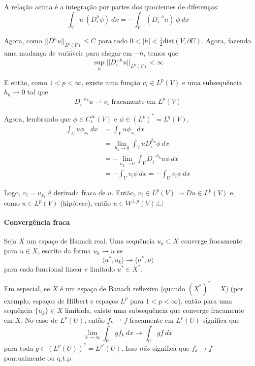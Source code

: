 \documentclass[a4paper, 11pt]{book}
\newcommand{\qed}{$\hfill\square$}
\begin{document}
\begin{enumerate}[(i)]
	A relação acima é a integração por partes dos quocientes de diferenças: \begin{equation}\label{intpartes-quocientes}
		\int_V u\ ( D_i^h \phi )\ dx = - \int_V (D_i^{-h}u)\ \phi \ dx 
	\end{equation}

	Agora, como $||D^h u||_{L^p(V)}\leq C$ para todo $0<|h|<\frac{1}{2}\text{dist}(V, \partial U)$. Agora, fazendo uma mudança de variáveis para chegar em $-h$, temos que
	\[ \sup_h ||D_i^{-h} u ||_{L^p(V)} < \infty \]

	E então, como $1<p<\infty$, existe uma função $v_i \in L^p(V)$ e uma subsequência $h_k \rightarrow 0$ tal que \[ D_i^{-h_k}u  \rightharpoonup v_i \text{ fracamente em } L^p(V)\]

	Agora, lembrando que $\phi \in C^\infty_c(V)$ e $\phi \in (L^p)^* = L^q(V)$, \begin{align*}
		\int_U u \phi_{x_i}\ dx &= \int_V u \phi_{x_i}\ dx \\ &= \lim_{h_k \rightarrow 0} \int_V u D_i^{h_k}\phi \ dx\\
		&= - \lim_{h_k\rightarrow 0} \int_V D_i^{-h_k}u \phi \ dx \\
		&= - \int_V v_i \phi \ dx = - \int_U v_i \phi \ dx
	\end{align*}

	Logo, $v_i = u_{x_i}$ é derivada fraca de $u$. Então, $v_i \in L^p(V) \Rightarrow Du \in L^p(V)$ e, como $u \in L^p(V)$ (hipótese), então $u \in W^{1,p}(V)$.\qed

\end{enumerate}

\paragraph{Convergência fraca}\label{def:convergencia-fraca} Seja $X$ um espaço de Banach real. Uma sequência ${u_k} \subset X$ converge fracamente para $u \in X$, escrito da forma $u_k \rightharpoonup u$ se \[ \langle u^*, u_k \rangle \rightarrow \langle u^*, u \rangle \] para cada funcional linear e limitado $u^* \in X^*$.

Em especial, se $X$ é um espaço de Banach reflexivo (quando $(X^*)^*=X$) (por exemplo, espaços de Hilbert e espaços $L^p$ para $1<p<\infty$), então para uma sequência $\{u_k\}\in X$ limitada, existe uma subsequência que converge fracamente em $X$. No caso de $L^p(U)$, então $f_k \rightharpoonup f$ fracamente em $L^p(U)$ significa que
\[\lim_{k\rightarrow\infty}\int_U g f_k\ dx \rightarrow \int_U gf\ dx \]
para toda $g \in (L^p(U))^* = L^{p'}(U)$. Isso \textit{não} significa que $f_k\rightarrow f$ pontualmente ou q.t.p.
\end{document}
